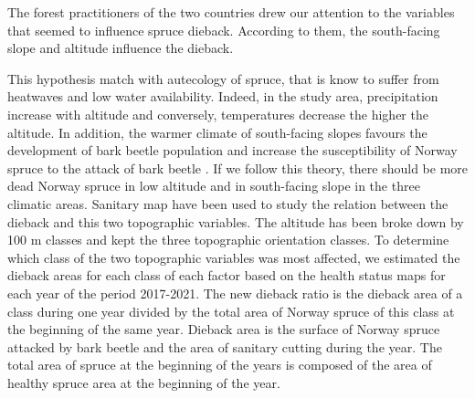 \documentclass[3p,procedia]{elsarticle}
\begin{document}

The forest practitioners of the two countries drew our attention to the variables that seemed to influence spruce dieback.
According to them, the south-facing slope and altitude influence the dieback.

This hypothesis match with autecology of spruce, that is know to suffer from heatwaves and low water availability.
Indeed, in the study area, precipitation increase with altitude and conversely, temperatures decrease the higher the altitude.
In addition, the warmer climate of south-facing slopes favours the development of bark beetle population \citep{annila_influence_1969, baier_phenipscomprehensive_2007, jonsson_2009, marini_climate_2012} and increase the susceptibility of Norway spruce to the attack of bark beetle \citep{wermelinger_ecology_2004, netherer_waterlimiting_2015}.
If we follow this theory, there should be more dead Norway spruce in low altitude and in south-facing slope in the three climatic areas.  
Sanitary map have been used to study the relation between the dieback and this two topographic variables.
The altitude has been broke down  by 100 m classes and kept the three topographic orientation classes.
To determine which class of the two topographic variables was most affected, we estimated the dieback areas for each class of each factor based on the health status maps for each year of the period 2017-2021.
The  new dieback ratio is  the dieback area of a class during one year divided by the total area of Norway spruce of this class at the beginning of the same year. 
Dieback area is the surface of Norway spruce attacked by bark beetle and the area of sanitary cutting during the year. 
The total area of spruce at the beginning of the years is composed of the area of healthy spruce area at the beginning of the year. 


\end{document}
